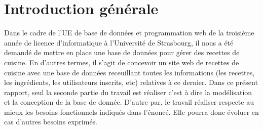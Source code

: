 \chapter*{Introduction générale}
Dans le cadre de l’UE de base de données et programmation web de la troisième année de licence
d’informatique à l’Université de Strasbourg, il nous a été demandé de mettre en place une base de données pour gérer des recettes de cuisine. En d'autres termes, il s'agit de concevoir un site web de recettes de cuisine avec une base de données receuillant toutes les informations (les recettes, les ingrédients, les utilisateurs inscrits, etc) relatives à ce dernier.
\newline
Dans ce présent rapport, seul la seconde partie du travail est réaliser c'est à dire la modélisation et la conception de la base de donnée.
\newline
D'autre par, le travail réaliser respecte au mieux les besoins fonctionnels indiqués dans l'énoncé. Elle pourra donc évoluer en cas d'autres besoins exprimés.